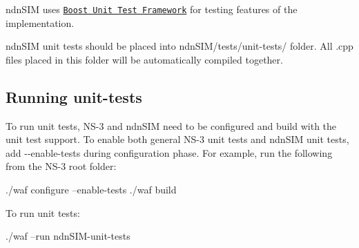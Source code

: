 ndn\+S\+IM uses \href{http://www.boost.org/doc/libs/1_48_0/libs/test/doc/html/index.html}{\tt Boost Unit Test Framework} for testing features of the implementation.

ndn\+S\+IM unit tests should be placed into {\ttfamily ndn\+S\+I\+M/tests/unit-\/tests/} folder. All {\ttfamily .cpp} files placed in this folder will be automatically compiled together.

\subsection*{Running unit-\/tests }

To run unit tests, N\+S-\/3 and ndn\+S\+IM need to be configured and build with the unit test support. To enable both general N\+S-\/3 unit tests and ndn\+S\+IM unit tests, add {\ttfamily -\/-\/enable-\/tests} during configuration phase. For example, run the following from the N\+S-\/3 root folder\+: \begin{DoxyVerb}./waf configure --enable-tests
./waf build
\end{DoxyVerb}


To run unit tests\+: \begin{DoxyVerb}./waf --run ndnSIM-unit-tests\end{DoxyVerb}
 